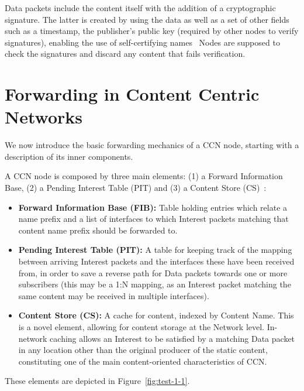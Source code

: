 Data packets include the content itself with the addition of a cryptographic 
signature. The latter is created by using the data as well as a set of other 
fields such as a timestamp, the publisher's public key (required by other 
nodes to verify signatures), enabling the use of self-certifying names~\cite{Jacobson2009} 
Nodes are supposed to check the signatures and discard any content that fails 
verification.

\section{Forwarding in Content Centric Networks}
\label{sec:ccn-forwarding}

We now introduce the basic forwarding mechanics of a CCN node, starting with 
a description of its inner components.\vertbreak

A CCN node is composed by three main elements: (1) a Forward Information 
Base, (2) a Pending Interest Table (PIT) and (3) a Content Store (CS)~\cite{Jacobson2009}:

\begin{itemize}

    \item \textbf{Forward Information Base (FIB):} Table holding entries 
        which relate a name prefix and a list of interfaces to which 
        Interest packets matching that content name prefix should be forwarded 
        to.
    \item \textbf{Pending Interest Table (PIT):} A table for keeping track of 
        the mapping between arriving Interest packets and 
        the interfaces these have been received from, in order to save a reverse 
        path for Data packets 
        towards one or more subscribers (this may be a 1:N mapping, as an 
        Interest packet matching the same content may be received in 
        multiple interfaces).
    \item \textbf{Content Store (CS):} A cache for content, indexed by Content 
        Name. This is a novel element, allowing for content storage at the 
        Network level. In-network caching allows an Interest to be satisfied 
        by a matching Data packet in any location other than the original 
        producer of the static content, constituting one of the main 
        content-oriented characteristics of CCN.

\end{itemize}

These elements are depicted in Figure~\ref{fig:test-1-1}.\vertbreak

